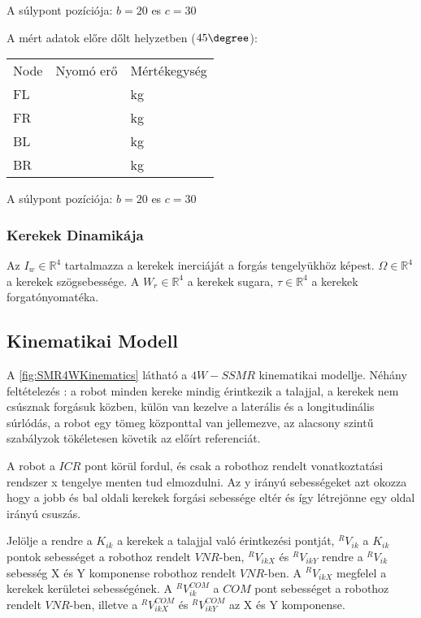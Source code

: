 A súlypont pozíciója: $b = 20$ es $c = 30 $

A mért adatok előre  dőlt helyzetben ($45 \degree $):

\begin{table}[H]
\center
\begin{tabular}{lll}
Node   & Nyomó erő & Mértékegység \\
FL &          & kg          \\
FR &          & kg          \\
BL &          & kg          \\
BR &          & kg            
\end{tabular}
\end{table}

A súlypont pozíciója: $b = 20$ es $c = 30 $

\subsubsection{Kerekek Dinamikája}
Az $I_w \in \mathbb{R}^4$ tartalmazza a kerekek inerciáját a forgás tengelyükhöz képest. $\Omega \in \mathbb{R}^4$ a kerekek szögsebessége. A $W_r \in \mathbb{R}^4$ a kerekek sugara, $\tau \in \mathbb{R}^4$ a kerekek forgatónyomatéka.




\subsection{Kinematikai Modell} 

A \ref{fig:SMR4WKinematics} látható a $4W-SSMR$ kinematikai modellje. Néhány feltételezés : a robot minden kereke mindig érintkezik a talajjal, a kerekek nem csúsznak forgásuk közben, külön van kezelve a laterális és a longitudinális súrlódás, a robot egy tömeg központtal van jellemezve, az alacsony szintű szabályzok tökéletesen követik az előírt referenciát.

A robot a $ICR$ pont körül fordul, és csak a robothoz rendelt vonatkoztatási rendszer x tengelye menten tud elmozdulni. Az y irányú sebességeket azt okozza hogy a jobb és bal oldali kerekek forgási sebessége eltér és így létrejönne egy oldal irányú csuszás. 

Jelölje a rendre a $K_{ik}$ a kerekek a talajjal való érintkezési pontját, $^RV_{ik}$ a $K_{ik}$ pontok sebességet a robothoz rendelt $VNR$-ben, $^RV_{ikX}$ és $^RV_{ikY}$ rendre a $^RV_{ik}$ sebesség X és Y komponense robothoz rendelt $VNR$-ben. A $^RV_{ikX}$ megfelel a kerekek kerületei sebességének. A $^RV^{COM}_{ik}$ a $COM$ pont sebességet a robothoz rendelt $VNR$-ben, illetve a $^RV^{COM}_{ikX}$ és $^RV^{COM}_{ikY}$ az X és Y komponense. 


